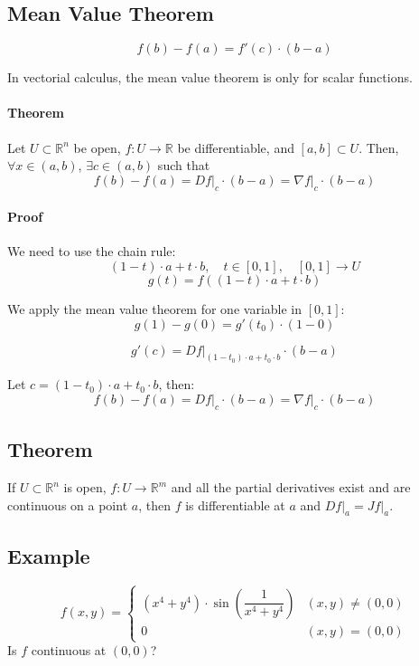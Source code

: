 \documentclass[11pt]{article}
\begin{document}
\subsection{Mean Value Theorem}
\[
f(b) - f(a) = f'(c) \cdot (b - a)
\]

In vectorial calculus, the mean value theorem is only for scalar functions.

\paragraph{Theorem}
Let $U \subset \mathbb{R}^n$ be open, $f : U \rightarrow \mathbb{R}$ be differentiable, and $[a,b] \subset U$. Then, $\forall x \in (a,b)$, $\exists c \in (a,b)$ such that
\[
f(b) - f(a) = Df \big|_c \cdot (b - a) = \nabla f \big|_c \cdot (b - a)
\]

\paragraph{Proof}
We need to use the chain rule:
\[
(1 - t) \cdot a + t \cdot b, \quad t \in [0,1], \quad [0,1] \rightarrow U
\]
\[
g(t) = f((1 - t) \cdot a + t \cdot b)
\]

We apply the mean value theorem for one variable in $[0,1]$:
\[
g(1) - g(0) = g'(t_0) \cdot (1 - 0)
\]

\[
g'(c) = Df \big|_{(1 - t_0) \cdot a + t_0 \cdot b} \cdot (b - a)
\]

Let $c = (1 - t_0) \cdot a + t_0 \cdot b$, then:
\[
f(b) - f(a) = Df \big|_c \cdot (b - a) = \nabla f \big|_c \cdot (b - a)
\]

\subsection{Theorem}
If $U \subset \mathbb{R}^n$ is open, $f : U \rightarrow \mathbb{R}^m$ and all the partial derivatives exist and are continuous on a point $a$, then $f$ is differentiable at $a$ and $Df \big|_a = Jf \big|_a$.

\subsection*{Example}
\[
f(x,y) = 
\begin{cases}
    (x^4 + y^4) \cdot \sin \left( \dfrac{1}{x^4 + y^4} \right) & (x,y) \neq (0,0) \\
    0 & (x,y) = (0,0)
\end{cases}
\]
Is $f$ continuous at $(0,0)$?
\end{document}
